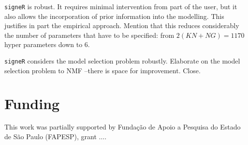 \documentclass{bioinfo}
\begin{document}
\texttt{signeR} is robust. It requires minimal intervention from part
of the user, but it also allows the incorporation of prior information
into the modelling. This justifies in part the empirical
approach. Mention that this reduces considerably the number of
parameters that have to be specified: from $2(KN+NG)=1170$ hyper
parameters down to 6.


\texttt{signeR} considers the model selection problem
robustly. Elaborate on the model selection problem to NMF --there is
space for improvement. Close.

\section*{Funding}
This work was partially supported by Funda\c{c}\~ao de Apoio a
Pesquisa do Estado de S\~ao Paulo (FAPESP), grant $\ldots$. 


 

\end{document}
